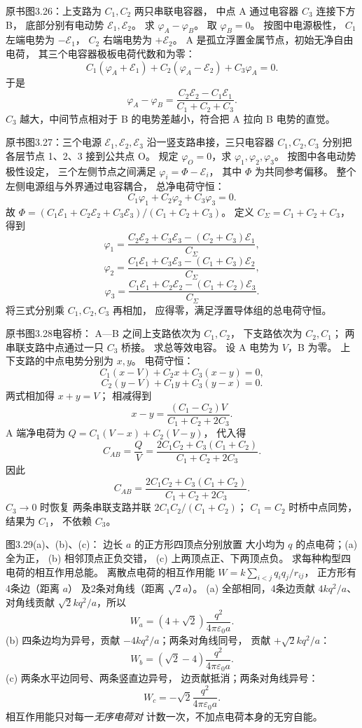 原书图3.26：上支路为
$C_1,C_2$ 两只串联电容器，
中点 A 通过电容器 $C_3$ 连接下方 B，
底部分别有电动势 $\mathcal E_1,\mathcal E_2$。
求 $\varphi_A-\varphi_B$。
\exsolution
取 $\varphi_B=0$。
按图中电源极性，
$C_1$ 左端电势为 $-\mathcal E_1$，
$C_2$ 右端电势为 $+\mathcal E_2$。
A 是孤立浮置金属节点，初始无净自由电荷，
其三个电容器极板电荷代数和为零：
\[
C_1(\varphi_A+\mathcal E_1)
+C_2(\varphi_A-\mathcal E_2)
+C_3\varphi_A=0.
\]
于是
\[
\boxed{\varphi_A-\varphi_B=
\frac{C_2\mathcal E_2-C_1\mathcal E_1}
{C_1+C_2+C_3}}.
\]
\excheck $C_3$ 越大，中间节点相对于 B
的电势差越小，符合把 A 拉向 B 电势的直觉。

原书图3.27：三个电源
$\mathcal E_1,\mathcal E_2,\mathcal E_3$
沿一竖支路串接，三只电容器
$C_1,C_2,C_3$ 分别把各层节点
1、2、3 接到公共点 O。
规定 $\varphi_O=0$，求
$\varphi_1,\varphi_2,\varphi_3$。
\exsolution
按图中各电动势极性设定，
三个左侧节点之间满足
$\varphi_i=\Phi-\mathcal E_i$，
其中 $\Phi$ 为共同参考偏移。
整个左侧电源组与外界通过电容耦合，
总净电荷守恒：
\[
C_1\varphi_1+C_2\varphi_2+C_3\varphi_3=0.
\]
故
$\Phi=(C_1\mathcal E_1+C_2\mathcal E_2+
C_3\mathcal E_3)/(C_1+C_2+C_3)$。
定义 $C_\Sigma=C_1+C_2+C_3$，得到
\[
\boxed{\varphi_1=
\frac{C_2\mathcal E_2+C_3\mathcal E_3-
(C_2+C_3)\mathcal E_1}{C_\Sigma}},
\]
\[
\boxed{\varphi_2=
\frac{C_1\mathcal E_1+C_3\mathcal E_3-
(C_1+C_3)\mathcal E_2}{C_\Sigma}},
\]
\[
\boxed{\varphi_3=
\frac{C_1\mathcal E_1+C_2\mathcal E_2-
(C_1+C_2)\mathcal E_3}{C_\Sigma}}.
\]
\excheck 将三式分别乘 $C_1,C_2,C_3$ 再相加，
应得零，满足浮置导体组的总电荷守恒。

原书图3.28电容桥：
A—B 之间上支路依次为 $C_1,C_2$，
下支路依次为 $C_2,C_1$；
两串联支路中点通过一只 $C_3$ 桥接。
求总等效电容。
\exsolution
设 A 电势为 $V$，B 为零。
上下支路的中点电势分别为 $x,y$。
电荷守恒：
\[
C_1(x-V)+C_2x+C_3(x-y)=0,
\]
\[
C_2(y-V)+C_1y+C_3(y-x)=0.
\]
两式相加得 $x+y=V$；
相减得到
\[
x-y=\frac{(C_1-C_2)V}{C_1+C_2+2C_3}.
\]
A 端净电荷为
$Q=C_1(V-x)+C_2(V-y)$，
代入得
\[
C_{AB}=\frac QV
=\frac{2C_1C_2+C_3(C_1+C_2)}
{C_1+C_2+2C_3}.
\]
因此
\[
\boxed{C_{AB}=
\frac{2C_1C_2+C_3(C_1+C_2)}
{C_1+C_2+2C_3}}.
\]
\excheck $C_3\to0$ 时恢复
两条串联支路并联
$2C_1C_2/(C_1+C_2)$；
$C_1=C_2$ 时桥中点同势，结果为 $C_1$，
不依赖 $C_3$。

图3.29(a)、(b)、(c)：
边长 $a$ 的正方形四顶点分别放置
大小均为 $q$ 的点电荷；(a) 全为正，
(b) 相邻顶点正负交错，
(c) 上两顶点正、下两顶点负。
求每种构型四电荷的相互作用总能。
\exsolution
离散点电荷的相互作用能
$W=k\sum_{i<j}q_iq_j/r_{ij}$，
正方形有4条边（距离 $a$）
及2条对角线（距离 $\sqrt2a$）。
(a) 全部相同，4条边贡献
$4kq^2/a$、对角线贡献
$\sqrt2kq^2/a$，所以
\[
\boxed{W_a=(4+\sqrt2)\frac{q^2}
{4\pi\varepsilon_0a}}.
\]
(b) 四条边均为异号，贡献
$-4kq^2/a$；两条对角线同号，
贡献 $+\sqrt2kq^2/a$：
\[
\boxed{W_b=(\sqrt2-4)\frac{q^2}
{4\pi\varepsilon_0a}}.
\]
(c) 两条水平边同号、两条竖直边异号，
边贡献抵消；两条对角线异号：
\[
\boxed{W_c=-\sqrt2\frac{q^2}
{4\pi\varepsilon_0a}}.
\]
\excheck 相互作用能只对每一\emph{无序电荷对}
计数一次，不加点电荷本身的无穷自能。


